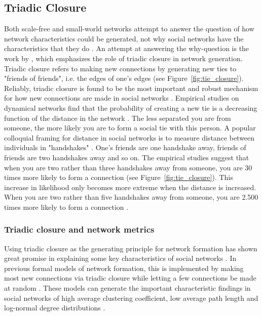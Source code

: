 \documentclass[11pt]{article}
\begin{document}
\subsection{Triadic Closure}
Both scale-free and small-world networks attempt to answer the question of how network characteristics could be generated, not why social networks have the characteristics that they do \cite{jacksonsearch2004}. An attempt at answering the why-question is the work by , which emphasizes the role of triadic closure in network generation. Triadic closure refers to making new connections by generating new ties to "friends of friends", i.e. the edges of one's edges (see Figure~\ref{fig:tie_closure}). Reliably, triadic closure is found to be the most important and robust mechanism for how new connections are made in social networks \cite{asikainen_cumulative_2020,bianconi_triadic_2014,kossinets_origins_2009,peixoto_disentangling_2022}. Empirical studies on dynamical networks find that the probability of creating a new tie is a decreasing function of the distance in the network \cite{bener_empirical_2016,kossinets_origins_2009}. The less separated you are from someone, the more likely you are to form a social tie with this person. A popular colloquial framing for distance in social networks is to measure distance between individuals in "handshakes" \cite{smith2005networks}. One's friends are one handshake away, friends of friends are two handshakes away and so on. The empirical studies suggest that when you are two rather than three handshakes away from someone, you are 30 times more likely to form a connection (see Figure~\ref{fig:tie_closure}). This increase in likelihood only becomes more extreme when the distance is increased. When you are two rather than five handshakes away from someone, you are 2.500 times more likely to form a connection \cite{kossinets_origins_2009}. 

\subsubsection{Triadic closure and network metrics}
Using triadic closure as the generating principle for network formation has shown great promise in explaining some key characteristics of social networks \cite{ilany_social_2016}. In previous formal models of network formation, this is implemented by making most new connections via triadic closure while letting a few connections be made at random \cite{ilany_social_2016,jacksonsearch2004,jacksonmeeting2007}. These models can generate the important characteristic findings in social networks of high average clustering coefficient, low average path length and log-normal degree distributions \cite{jacksonsearch2004,jacksonmeeting2007}. 
\end{document}

